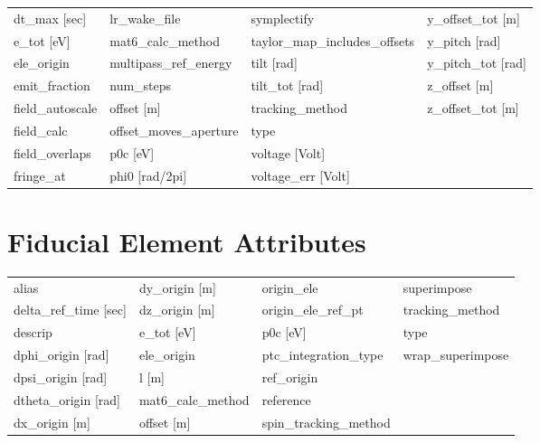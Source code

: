 \begin{tabular}{llll}
dt_max [sec]                     & lr_wake_file                     & symplectify                      & y_offset_tot [m]                 \\
e_tot [eV]                       & mat6_calc_method                 & taylor_map_includes_offsets      & y_pitch [rad]                    \\
ele_origin                       & multipass_ref_energy             & tilt [rad]                       & y_pitch_tot [rad]                \\
emit_fraction                    & num_steps                        & tilt_tot [rad]                   & z_offset [m]                     \\
field_autoscale                  & offset [m]                       & tracking_method                  & z_offset_tot [m]                 \\
field_calc                       & offset_moves_aperture            & type                             &                                  \\
field_overlaps                   & p0c [eV]                         & voltage [Volt]                   &                                  \\
fringe_at                        & phi0 [rad/2pi]                   & voltage_err [Volt]               &                                  \\
 \bottomrule
 \end{tabular}
 \vfill
 
 \section{Fiducial Element Attributes}
 \label{s:list.fiducial}
 
 \begin{tabular}{llll} \toprule
alias                            & dy_origin [m]                    & origin_ele                       & superimpose                      \\
delta_ref_time [sec]             & dz_origin [m]                    & origin_ele_ref_pt                & tracking_method                  \\
descrip                          & e_tot [eV]                       & p0c [eV]                         & type                             \\
dphi_origin [rad]                & ele_origin                       & ptc_integration_type             & wrap_superimpose                 \\
dpsi_origin [rad]                & l [m]                            & ref_origin                       &                                  \\
dtheta_origin [rad]              & mat6_calc_method                 & reference                        &                                  \\
dx_origin [m]                    & offset [m]                       & spin_tracking_method             &                                  \\
 \bottomrule
 \end{tabular}
 \vfill
 
